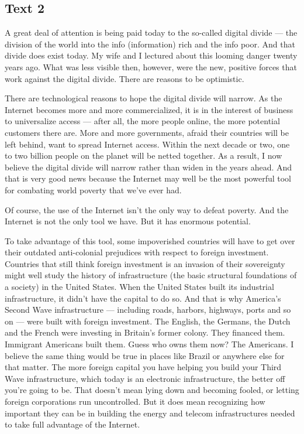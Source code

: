\documentclass[UTF8,11pt]{ctexart}
\begin{document}
\subsection*{\textbf{Text 2}}


A great deal of attention is being paid today to the so-called digital divide — the division of the world into the info (information) rich and the info poor. And that divide does exist today. My wife and I lectured about this looming danger twenty years ago. What was less visible then, however, were the new, positive forces that work against the digital divide. There are reasons to be optimistic.


There are technological reasons to hope the digital divide will narrow. As the Internet becomes more and more commercialized, it is in the interest of business to universalize access — after all, the more people online, the more potential customers there are. More and more governments, afraid their countries will be left behind, want to spread Internet access. Within the next decade or two, one to two billion people on the planet will be netted together. As a result, I now believe the digital divide will narrow rather than widen in the years ahead. And that is very good news because the Internet may well be the most powerful tool for combating world poverty that we’ve ever had.


Of course, the use of the Internet isn’t the only way to defeat poverty. And the Internet is not the only tool we have. But it has enormous potential.


To take advantage of this tool, some impoverished countries will have to get over their outdated anti-colonial prejudices with respect to foreign investment. Countries that still think foreign investment is an invasion of their sovereignty might well study the history of infrastructure (the basic structural foundations of a society) in the United States. When the United States built its industrial infrastructure, it didn’t have the capital to do so. And that is why America’s Second Wave infrastructure — including roads, harbors, highways, ports and so on — were built with foreign investment. The English, the Germans, the Dutch and the French were investing in Britain’s former colony. They financed them. Immigrant Americans built them. Guess who owns them now? The Americans. I believe the same thing would be true in places like Brazil or anywhere else for that matter. The more foreign capital you have helping you build your Third Wave infrastructure, which today is an electronic infrastructure, the better off you’re going to be. That doesn’t mean lying down and becoming fooled, or letting foreign corporations run uncontrolled. But it does mean recognizing how important they can be in building the energy and telecom infrastructures needed to take full advantage of the Internet.
\end{document}
